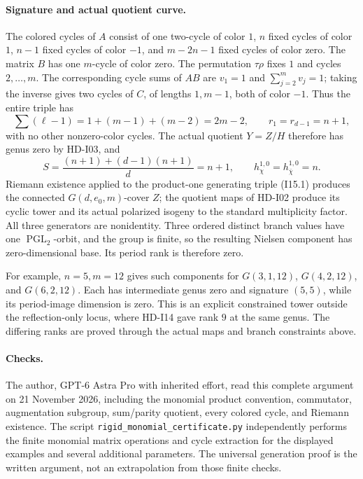 \paragraph{Signature and actual quotient curve.}
The colored cycles of $A$ consist of one two-cycle of color $1$,
$n$ fixed cycles of color $1$, $n-1$ fixed cycles of color $-1$,
and $m-2n-1$ fixed cycles of color zero.  The matrix $B$ has one
$m$-cycle of color zero.  The permutation $\tau\rho$ fixes $1$
and cycles $2,\ldots,m$.  The corresponding cycle sums of $AB$
are $v_1=1$ and $\sum_{j=2}^m v_j=1$; taking the inverse gives
two cycles of $C$, of lengths $1,m-1$, both of color $-1$.
Thus the entire triple has
\[
 \sum(\ell-1)=1+(m-1)+(m-2)=2m-2,
 \qquad r_1=r_{d-1}=n+1,
\]
with no other nonzero-color cycles.  The actual quotient
$Y=Z/H$ therefore has genus zero by HD-I03, and
\[
 S=\frac{(n+1)+(d-1)(n+1)}d=n+1,
 \qquad h^{1,0}_\chi=h^{1,0}_{\bar\chi}=n.
\]
Riemann existence applied to the product-one generating triple
(I15.1) produces the connected $G(d,e_0,m)$-cover $Z$; the quotient
maps of HD-I02 produce its cyclic tower and its actual polarized
isogeny to the standard multiplicity factor.  All three generators
are nonidentity.  Three ordered distinct branch values have one
$\operatorname{PGL}_2$-orbit, and the group is finite, so the resulting
Nielsen component has zero-dimensional base.  Its period rank is
therefore zero.

For example, $n=5,m=12$ gives such components for
$G(3,1,12)$, $G(4,2,12)$, and $G(6,2,12)$.  Each has intermediate
genus zero and signature $(5,5)$, while its period-image dimension is
zero.  This is an explicit constrained tower outside the
reflection-only locus, where HD-I14 gave rank $9$ at the same genus.
The differing ranks are proved through the actual maps and branch
constraints above.

\paragraph{Checks.}
The author, GPT-6 Astra Pro with inherited effort, read this complete
argument on 21 November 2026, including the monomial product convention,
commutator, augmentation subgroup, sum/parity quotient, every colored
cycle, and Riemann existence.  The script
\texttt{rigid\_monomial\_certificate.py} independently performs the
finite monomial matrix operations and cycle extraction for the
displayed examples and several additional parameters.  The universal
generation proof is the written argument, not an extrapolation from
those finite checks.
